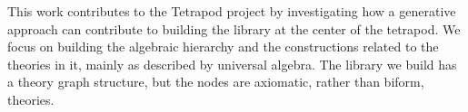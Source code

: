 This work contributes to the Tetrapod project by investigating how a generative approach can contribute to building the library at the center of the tetrapod. We focus on building the algebraic hierarchy and the constructions related to the theories in it, mainly as described by universal algebra. The library we build has a theory graph structure, but the nodes are axiomatic, rather than biform, theories. 





